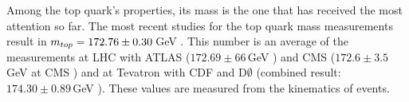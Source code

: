 
Among the top quark's properties, its mass is the one that has received the most attention so far.
The most recent studies for the top quark mass measurements result in $m_{top} = 172.76 \pm 0.30\,$GeV \cite{pdgTop}. 
This number is an average of the measurements at LHC with ATLAS ($172.69 \pm 66\,$GeV \cite{ATLAS:2018fwq})
 and CMS ($172.6 \pm 3.5\,$GeV at CMS \cite{CMS:2019fak}) 
 and at Tevatron with CDF and D$\emptyset$ (combined result: $174.30 \pm 0.89\,$GeV \cite{CDF:2016vzt}).
These values are measured from the kinematics of  \ttbar events.%

 












